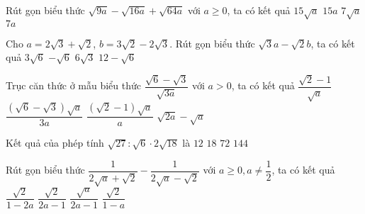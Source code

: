 \begin{ex}
	Rút gọn biểu thức $\sqrt{9 a}-\sqrt{16 a}+\sqrt{64 a}$ với $a \geq 0$, ta có kết quả
	\choice
	{$15 \sqrt{a}$}
	{$15 a$}
	{\True $7 \sqrt{a}$}
	{$7 a$}
\end{ex}
\begin{ex}
	Cho $a =2 \sqrt{3}+\sqrt{2}$, $b =3 \sqrt{2}-2 \sqrt{3}$. Rút gọn biểu thức $\sqrt{3}a-\sqrt{2} b$, ta có kết quả
	\choice
	{\True $3 \sqrt{6}$}
	{$-\sqrt{6}$}
	{$6 \sqrt{3}$}
	{$12-\sqrt{6}$}
\end{ex}
\begin{ex}
	Trục căn thức ở mẫu biểu thức $\dfrac{\sqrt{6}-\sqrt{3}}{\sqrt{3 a}}$ với $a >0$, ta có kết quả
	\choice
	{$\dfrac{\sqrt{2}-1}{\sqrt{a}}$}
	{$\dfrac{(\sqrt{6}-\sqrt{3}) \sqrt{a}}{3a}$}
	{\True $\dfrac{(\sqrt{2}-1) \sqrt{a}}{a}$}
	{$\sqrt{2a}-\sqrt{a}$}
\end{ex}
\begin{ex}
	Kết quả của phép tính $\sqrt{27}: \sqrt{6} \cdot 2 \sqrt{18}$ là
	\choice
	{$12$}
	{\True $18$}
	{$72$}
	{$144$}
\end{ex}
\begin{ex}
	Rút gọn biểu thức $\dfrac{1}{2 \sqrt{a}+\sqrt{2}}-\dfrac{1}{2 \sqrt{a}-\sqrt{2}}$ với $a \geq 0,a\neq \dfrac{1}{2}$, ta có kết quả
	\choice
	{\True $\dfrac{\sqrt{2}}{1-2 a}$}
	{$\dfrac{\sqrt{2}}{2 a-1}$}
	{$\dfrac{\sqrt{a}}{2 a-1}$}
	{$\dfrac{\sqrt{2}}{1-a}$}
\end{ex}
